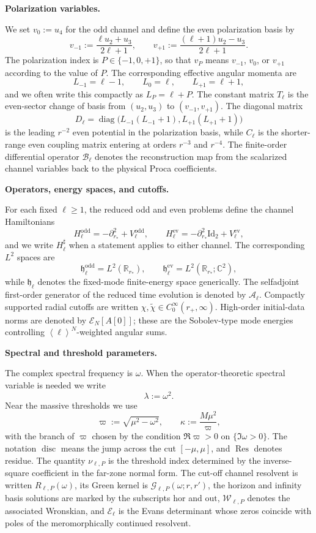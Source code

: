 \documentclass[12pt]{article}
\numberwithin{equation}{section}
\theoremstyle{plain}
\theoremstyle{definition}
\theoremstyle{remark}
\newcommand{\R}{\mathbb R}
\newcommand{\C}{\mathbb C}
\newcommand{\disc}{\operatorname{disc}}
\newcommand{\Res}{\operatorname{Res}}
\newcommand{\diag}{\operatorname{diag}}
\newcommand{\hor}{\mathrm{hor}}
\newcommand{\out}{\mathrm{out}}
\newcommand{\cG}{\mathcal G}
\newcommand{\cW}{\mathcal W}
\newcommand{\cA}{\mathcal A}
\newcommand{\cE}{\mathcal E}
\newcommand{\om}{\omega}
\newcommand{\vp}{\varpi}
\newcommand{\kap}{\kappa}
\newcommand{\angles}[1]{\left\langle #1 \right\rangle}
\newcommand{\Id}{\mathrm{Id}}
\begin{document}
\medskip\noindent\textbf{Polarization variables.}\par\smallskip\noindent
We set $v_0:=u_4$ for the odd channel and define the even polarization basis by
\[
   v_{-1}:=\frac{\ell u_2+u_3}{2\ell+1},
   \qquad
   v_{+1}:=\frac{(\ell+1)u_2-u_3}{2\ell+1}.
\]
The polarization index is $P\in\{-1,0,+1\}$, so that $v_P$ means $v_{-1}$, $v_0$, or $v_{+1}$ according to the value of $P$.  The corresponding effective angular momenta are
\[
   L_{-1}=\ell-1,
   \qquad
   L_0=\ell,
   \qquad
   L_{+1}=\ell+1,
\]
and we often write this compactly as $L_P=\ell+P$.  The constant matrix $T_\ell$ is the even-sector change of basis from $(u_2,u_3)$ to $(v_{-1},v_{+1})$.  The diagonal matrix
\[
   D_\ell=\diag\bigl(L_{-1}(L_{-1}+1),L_{+1}(L_{+1}+1)\bigr)
\]
is the leading $r^{-2}$ even potential in the polarization basis, while $C_\ell$ is the shorter-range even coupling matrix entering at orders $r^{-3}$ and $r^{-4}$.  The finite-order differential operator $\mathcal B_\ell$ denotes the reconstruction map from the scalarized channel variables back to the physical Proca coefficients.

\medskip\noindent\textbf{Operators, energy spaces, and cutoffs.}\par\smallskip\noindent
For each fixed $\ell\ge1$, the reduced odd and even problems define the channel Hamiltonians
\[
   H_{\ell}^{\mathrm{odd}}=-\partial_{r_*}^2+V_{\ell}^{\mathrm{odd}},
   \qquad
   H_{\ell}^{\mathrm{ev}}=-\partial_{r_*}^2\Id_2+V_{\ell}^{\mathrm{ev}},
\]
and we write $H_\ell^{\sharp}$ when a statement applies to either channel.  The corresponding $L^2$ spaces are
\[
   \mathfrak h_{\ell}^{\mathrm{odd}}=L^2(\R_{r_*}),
   \qquad
   \mathfrak h_{\ell}^{\mathrm{ev}}=L^2(\R_{r_*};\C^2),
\]
while $\mathfrak h_\ell$ denotes the fixed-mode finite-energy space generically.  The selfadjoint first-order generator of the reduced time evolution is denoted by $\cA_\ell$.  Compactly supported radial cutoffs are written $\chi,\widetilde\chi\in C_0^\infty(r_+,\infty)$.  High-order initial-data norms are denoted by $\mathcal E_N[A[0]]$; these are the Sobolev-type mode energies controlling $\angles{\ell}^{N}$-weighted angular sums.

\medskip\noindent\textbf{Spectral and threshold parameters.}\par\smallskip\noindent
The complex spectral frequency is $\om$.  When the operator-theoretic spectral variable is needed we write
\[
   \lambda:=\om^2.
\]
Near the massive thresholds we use
\[
   \vp:=\sqrt{\mu^2-\om^2},
   \qquad
   \kap:=\frac{M\mu^2}{\vp},
\]
with the branch of $\vp$ chosen by the condition $\Re\vp>0$ on $\{\Im\om>0\}$.  The notation $\disc$ means the jump across the cut $[-\mu,\mu]$, and $\Res$ denotes residue.  The quantity $\nu_{\ell,P}$ is the threshold index determined by the inverse-square coefficient in the far-zone normal form.  The cut-off channel resolvent is written $R_{\ell,P}(\om)$, its Green kernel is $\cG_{\ell,P}(\om;r,r')$, the horizon and infinity basis solutions are marked by the subscripts $\hor$ and $\out$, $\cW_{\ell,P}$ denotes the associated Wronskian, and $\cE_\ell$ is the Evans determinant whose zeros coincide with poles of the meromorphically continued resolvent.
\end{document}
